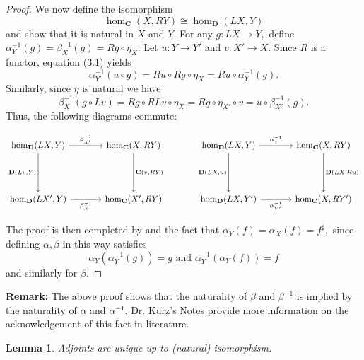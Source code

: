 \documentclass{article}
\newtheorem{lemma}[proposition]{Lemma}
\numberwithin{equation}{section}
\newcommand{\cat}[1]{{\mathbf{#1}}}
\begin{document}
\begin{proof}
We now define the isomorphism $$\hom_\cat{C}(X, RY) \cong \hom_\cat{D}(LX, Y)$$ and show that it is natural in $X$ and $Y.$ For any $g : LX \to Y,$ define $\alpha^{-1}_Y(g) = \beta^{-1}_X(g) = Rg \circ \eta_X.$ Let $u : Y \to Y'$ and $v : X' \to X.$ Since $R$ is a functor, equation (3.1) yields $$\alpha_{Y'}^{-1}(u \circ g) = Ru \circ Rg \circ \eta_X = Ru \circ \alpha_Y^{-1}(g).$$ Similarly, since $\eta$ is natural we have $$\beta^{-1}_{X}(g \circ Lv) = Rg \circ RLv \circ \eta_X = Rg \circ \eta_{X'} \circ v = u \circ \beta_{X'}^{-1}(g).$$ Thus, the following diagrams commute:

\[\begin{tikzcd}[column sep=scriptsize,row sep=2.25em]
	{\hom_\textbf D (LX, Y)} && {\hom_\textbf C(X, RY)} && {\hom_\textbf D (LX, Y)} && {\hom_\textbf C(X, RY)} \\
	\\
	{\hom_\textbf D (LX', Y)} && {\hom_\textbf C(X', RY)} && {\hom_\textbf D (LX, Y')} && {\hom_\textbf C(X, RY')}
	\arrow["{\beta^{-1}_X}"', from=3-1, to=3-3]
	\arrow["{\beta^{-1}_{X'}}", from=1-1, to=1-3]
	\arrow["{\textbf D(Lv, Y)}"', from=1-1, to=3-1]
	\arrow["{\textbf C(v, RY)}", from=1-3, to=3-3]
	\arrow["{\alpha^{-1}_{Y'}}"', from=3-5, to=3-7]
	\arrow["{\textbf D(LX, u)}"', from=1-5, to=3-5]
	\arrow["{\textbf D(LX, Ru)}", from=1-7, to=3-7]
	\arrow["{\alpha^{-1}_{Y}}", from=1-5, to=1-7]
\end{tikzcd}\]

The proof is then completed by  and the fact that $\alpha_Y(f) = \alpha_X(f) = f^\sharp,$ since defining $\alpha, \beta$ in this way satisfies $$\alpha_Y(\alpha^{-1}_Y(g)) = g \text{ and } \alpha^{-1}_Y(\alpha_Y(f)) = f$$ and similarly for $\beta.$

\end{proof}

\textbf{Remark:} The above proof shows that the naturality of $\beta$ and $\beta^{-1}$ is implied by the naturality of $\alpha$ and $\alpha^{-1}$. \href{https://hackmd.io/@alexhkurz/HyT3zuR8h#Literature-Review}{Dr. Kurz's Notes} provide more information on the acknowledgement of this fact in literature. 

\begin{lemma}
Adjoints are unique up to (natural) isomorphism. 
\end{lemma}
\end{document}
